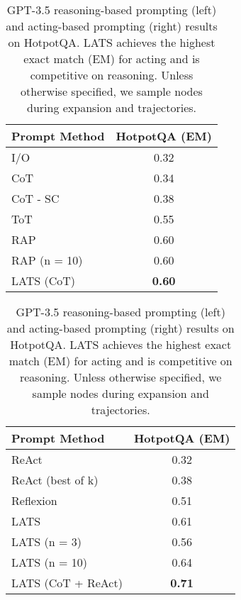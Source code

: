 \documentclass{article} \usepackage{iclr2024_conference,times}
\begin{document}
\begin{table}[t]
    \centering
    \begin{minipage}{0.5\linewidth}
        \centering
        \begin{tabular}{l|c}
        \toprule
            \textbf{Prompt Method} & \textbf{HotpotQA (EM)} \\
        \midrule
            I/O & 0.32 \\
            CoT {\scriptsize~\citep{wei2022chain}} & 0.34 \\ 
            CoT - SC {\scriptsize~\citep{wang2022self}} & 0.38 \\
            ToT {\scriptsize~\citep{yao2023tree}} & 0.55 \\
            RAP {\scriptsize~\citep{hao2023reasoning}} & 0.60 \\
            RAP (n = 10) & 0.60 \\
            LATS (CoT) & \textbf{0.60} \\
        \bottomrule
        \end{tabular}
    \end{minipage}\begin{minipage}{0.5\linewidth}
        \centering
        \begin{tabular}{l|c}
        \toprule
            \textbf{Prompt Method} & \textbf{HotpotQA (EM)} \\
        \midrule
            ReAct {\scriptsize~\citep{yao2023react}} & 0.32 \\
            ReAct (best of k) & 0.38 \\
            Reflexion {\scriptsize~\citep{shinn2023reflexion}} & 0.51 \\
            LATS & 0.61 \\
            LATS (n = 3) & 0.56 \\
            LATS (n = 10) & 0.64 \\
            LATS (CoT + ReAct) & \textbf{0.71} \\
        \bottomrule
        \end{tabular}
    \end{minipage}
    \caption{GPT-3.5 reasoning-based prompting (left) and acting-based prompting (right) results on HotpotQA. LATS achieves the highest exact match (EM) for acting and is competitive on reasoning. Unless otherwise specified, we sample  nodes during expansion and  trajectories.}
    \label{table:hotpot}
\end{table}
\end{document}
